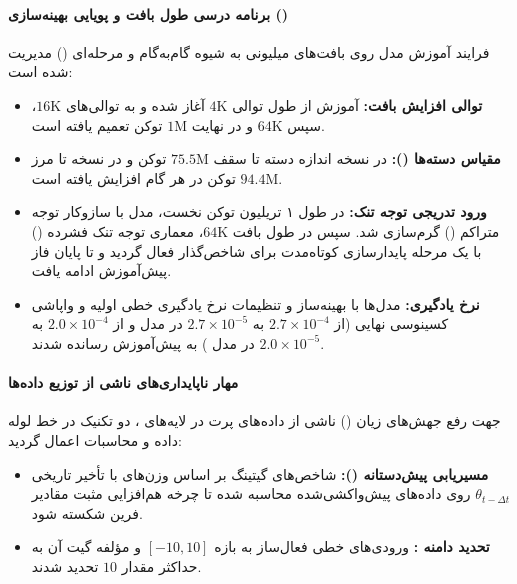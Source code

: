 \paragraph*{برنامه درسی طول بافت و پویایی بهینه‌سازی ()}
فرایند آموزش مدل روی بافت‌های میلیونی به شیوه گام‌به‌گام و مرحله‌ای () مدیریت شده است:
\begin{itemize}
    \item \textbf{توالی افزایش بافت:} آموزش از طول توالی $4\text{K}$ آغاز شده و به توالی‌های $16\text{K}$، سپس $64\text{K}$ و در نهایت $1\text{M}$ توکن تعمیم یافته است.
    \item \textbf{مقیاس دسته‌ها ():} در نسخه  اندازه دسته تا سقف $75.5\text{M}$ توکن و در نسخه  تا مرز $94.4\text{M}$ توکن در هر گام افزایش یافته است.
    \item \textbf{ورود تدریجی توجه تنک:} در طول ۱ تریلیون توکن نخست، مدل با سازوکار توجه متراکم () گرم‌سازی شد. سپس در طول بافت $64\text{K}$، معماری توجه تنک فشرده () با یک مرحله پایدارسازی کوتاه‌مدت برای شاخص‌گذار  فعال گردید و تا پایان فاز پیش‌آموزش ادامه یافت.
    \item \textbf{نرخ یادگیری:} مدل‌ها با بهینه‌ساز  \cite{jordan2024muon, liu2025muon} و تنظیمات نرخ یادگیری خطی اولیه و واپاشی کسینوسی نهایی (از $2.7 \times 10^{-4}$ به $2.7 \times 10^{-5}$ در مدل  و از $2.0 \times 10^{-4}$ به $2.0 \times 10^{-5}$ در مدل ) به پیش‌آموزش رسانده شدند.
\end{itemize}

\paragraph*{مهار ناپایداری‌های ناشی از توزیع داده‌ها}
جهت رفع جهش‌های زیان () ناشی از داده‌های پرت در لایه‌های ، دو تکنیک در خط لوله داده و محاسبات اعمال گردید:
\begin{itemize}
    \item \textbf{مسیریابی پیش‌دستانه ():} شاخص‌های گیتینگ بر اساس وزن‌های با تأخیر تاریخی $\theta_{t-\Delta t}$ روی داده‌های پیش‌واکشی‌شده محاسبه شده تا چرخه هم‌افزایی مثبت مقادیر فرین شکسته شود.
    \item \textbf{تحدید دامنه :} ورودی‌های خطی فعال‌ساز  \cite{shazeer2020glu} به بازه $[-10, 10]$ و مؤلفه گیت آن به حداکثر مقدار $10$ تحدید شدند.
\end{itemize}

